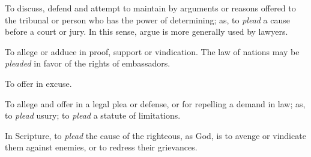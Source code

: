 		\begin{compactitem}
			\item To discuss, defend and attempt to maintain by arguments or reasons offered to the tribunal or person who has the power of determining; as, to \textit{plead} a cause before a court or jury. In this sense, argue is more generally used by lawyers.
			\item[1] To allege or adduce in proof, support or vindication. The law of nations may be \textit{pleaded} in favor of the rights of embassadors.
			\item[2] To offer in excuse.
			\item[3] To allege and offer in a legal plea or defense, or for repelling a demand in law; as, to \textit{plead} usury; to \textit{plead} a statute of limitations.
			\item[4] In Scripture, to \textit{plead} the cause of the righteous, as God, is to avenge or vindicate them against enemies, or to redress their grievances.
		\end{compactitem}


	

	



